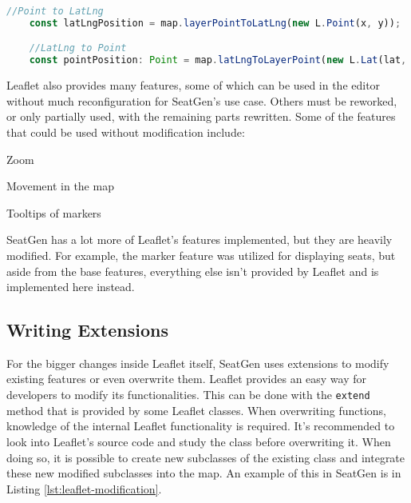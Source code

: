 \begin{lstlisting}[language=TypeScript, caption={Latitude Longitude and Point Conversion}, label={lst:latlng-point}]
    //Point to LatLng
    const latLngPosition = map.layerPointToLatLng(new L.Point(x, y));

    //LatLng to Point
    const pointPosition: Point = map.latLngToLayerPoint(new L.Lat(lat, lng));
\end{lstlisting}

Leaflet also provides many features, some of which can be used in the editor without much reconfiguration for SeatGen's use case. Others must be reworked, or only partially used, with the remaining parts rewritten. Some of the features that could be used without modification include:
\begin{compactitem}
\item Zoom
\item Movement in the map
\item Tooltips of markers
\end{compactitem} 

SeatGen has a lot more of Leaflet's features implemented, but they are heavily modified. For example, the marker feature was utilized for displaying seats, but aside from the base features, everything else isn't provided by Leaflet and is implemented here instead.

\subsection{Writing Extensions}
For the bigger changes inside Leaflet itself, SeatGen uses extensions to modify existing features or even overwrite them. Leaflet provides an easy way for developers to modify its functionalities. This can be done with the \texttt{extend} method that is provided by some Leaflet classes. When overwriting functions, knowledge of the internal Leaflet functionality is required. It's recommended to look into Leaflet's source code and study the class before overwriting it. When doing so, it is possible to create new subclasses of the existing class and integrate these new modified subclasses into the map. An example of this in SeatGen is in Listing \ref{lst:leaflet-modification}.


